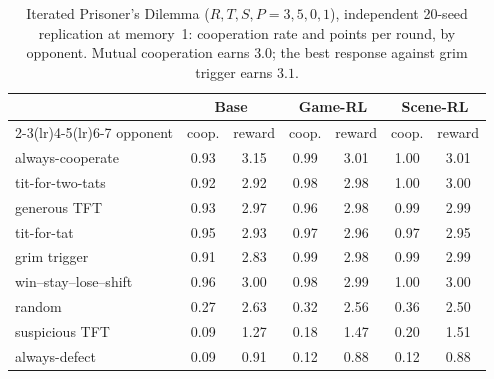 \begin{table}[t]
\centering\small
\caption{Iterated Prisoner's Dilemma ($R,T,S,P=3,5,0,1$), independent 20-seed replication at memory~1: cooperation rate and points per round, by opponent. Mutual cooperation earns $3.0$; the best response against grim trigger earns $3.1$.}
\label{tab:ipd-rep}
\begin{tabular}{@{}l cc cc cc@{}}
\toprule
& \multicolumn{2}{c}{Base} & \multicolumn{2}{c}{Game-RL} & \multicolumn{2}{c}{Scene-RL} \\
\cmidrule(lr){2-3}\cmidrule(lr){4-5}\cmidrule(lr){6-7}
opponent & coop. & reward & coop. & reward & coop. & reward \\
\midrule
always-cooperate & 0.93 & 3.15 & 0.99 & 3.01 & 1.00 & 3.01 \\
tit-for-two-tats & 0.92 & 2.92 & 0.98 & 2.98 & 1.00 & 3.00 \\
generous TFT & 0.93 & 2.97 & 0.96 & 2.98 & 0.99 & 2.99 \\
tit-for-tat & 0.95 & 2.93 & 0.97 & 2.96 & 0.97 & 2.95 \\
grim trigger & 0.91 & 2.83 & 0.99 & 2.98 & 0.99 & 2.99 \\
win--stay--lose--shift & 0.96 & 3.00 & 0.98 & 2.99 & 1.00 & 3.00 \\
random & 0.27 & 2.63 & 0.32 & 2.56 & 0.36 & 2.50 \\
suspicious TFT & 0.09 & 1.27 & 0.18 & 1.47 & 0.20 & 1.51 \\
always-defect & 0.09 & 0.91 & 0.12 & 0.88 & 0.12 & 0.88 \\
\bottomrule
\end{tabular}
\end{table}

